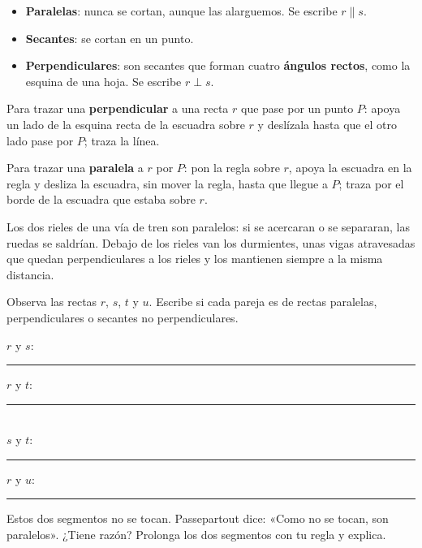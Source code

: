 \documentclass[11pt]{article}
\begin{document}
\begin{itemize}
  \item \textbf{Paralelas}: nunca se cortan, aunque las alarguemos. Se escribe $r \parallel s$.
  \item \textbf{Secantes}: se cortan en un punto.
  \item \textbf{Perpendiculares}: son secantes que forman cuatro
        \textbf{ángulos rectos}, como la esquina de una hoja. Se escribe $r \perp s$.
\end{itemize}

\begin{ejemplo}
Para trazar una \textbf{perpendicular} a una recta $r$ que pase por un punto
$P$: apoya un lado de la esquina recta de la escuadra sobre $r$ y deslízala
hasta que el otro lado pase por $P$; traza la línea.

Para trazar una \textbf{paralela} a $r$ por $P$: pon la regla sobre $r$,
apoya la escuadra en la regla y desliza la escuadra, sin mover la regla,
hasta que llegue a $P$; traza por el borde de la escuadra que estaba sobre
$r$.
\end{ejemplo}

\begin{aplicacion}
Los dos rieles de una vía de tren son paralelos: si se acercaran o se
separaran, las ruedas se saldrían. Debajo de los rieles van los durmientes,
unas vigas atravesadas que quedan perpendiculares a los rieles y los
mantienen siempre a la misma distancia.
\end{aplicacion}

\begin{preguntas}
\pregunta Observa las rectas $r$, $s$, $t$ y $u$. Escribe si cada pareja es
de rectas paralelas, perpendiculares o secantes no perpendiculares.
\begin{center}
\end{center}
$r$ y $s$: \rule{3cm}{0.4pt} \quad $r$ y $t$: \rule{3cm}{0.4pt}\\[0.6em]
$s$ y $t$: \rule{3cm}{0.4pt} \quad $r$ y $u$: \rule{3cm}{0.4pt}

\pregunta Estos dos segmentos no se tocan. Passepartout dice: «Como no se
tocan, son paralelos». ¿Tiene razón? Prolonga los dos segmentos con tu regla
y explica.
\begin{center}
\end{center}
\end{preguntas}
\end{document}
